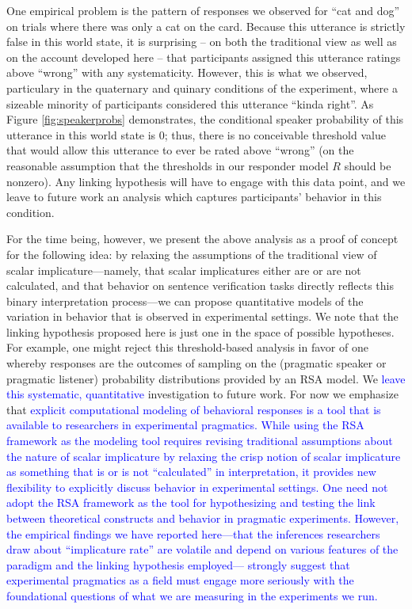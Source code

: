\documentclass[man]{apa6}
\newcommand{\change}[1]{\textcolor{Blue}{#1}}
\theoremstyle{definition}
\theoremstyle{definition}
\theoremstyle{definition}
\theoremstyle{remark}
\begin{document}
One empirical problem is the pattern of responses we observed
for \enquote{cat and dog} on trials where there was only a cat on the
card. Because this utterance is strictly false in this world state, it
is surprising -- on both the traditional view as well as on the account
developed here -- that participants assigned this utterance ratings
above \enquote{wrong} with any systematicity. However, this is 
what we observed, particulary in the quaternary and quinary conditions
of the experiment, where a sizeable minority of participants considered
this utterance \enquote{kinda right}. As Figure \ref{fig:speakerprobs}
demonstrates, the conditional speaker probability of this utterance in
this world state is 0; thus, there is no conceivable threshold value
that would allow this utterance to ever be rated above \enquote{wrong}
(on the reasonable assumption that the thresholds in our responder model
\(R\) should be nonzero). Any linking hypothesis will have to engage
with this data point, and we leave to future work an analysis which
captures participants' behavior in this condition.

For the time being, however, we present the above analysis as a proof of
concept for the following idea: by relaxing the assumptions of the
traditional view of scalar implicature---namely, that scalar implicatures
either are or are not calculated, and that behavior on sentence
verification tasks directly reflects this binary interpretation
process---we can propose quantitative models of the variation in
behavior that is observed in experimental settings. We note that the linking
hypothesis proposed here is just one in the space of possible hypotheses. For
example, one might reject this threshold-based analysis in favor of one
whereby responses are the outcomes of sampling on the (pragmatic speaker
or pragmatic listener) probability distributions provided by an RSA
model. We \change{leave this systematic, quantitative} investigation to future work. For now we
emphasize that \change{explicit computational modeling of behavioral responses is a tool that is  available to researchers in experimental
pragmatics. While using the RSA framework as the modeling tool requires revising traditional assumptions about the nature of scalar
implicature by relaxing the crisp notion of scalar
implicature as something that is or is not \enquote{calculated} in
interpretation, it provides new flexibility to explicitly discuss
 behavior in experimental settings. One need not adopt the RSA framework as the tool for hypothesizing and testing the link between theoretical constructs and behavior in pragmatic experiments. However, the empirical findings we have reported here---that the inferences researchers draw about ``implicature rate'' are volatile and depend on various features of the paradigm and the linking hypothesis employed--- strongly suggest that experimental pragmatics  as a field must engage more seriously with the foundational questions of what we are measuring in the experiments we run.}
\end{document}
